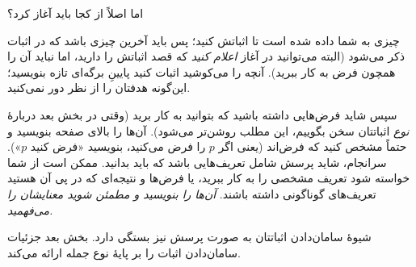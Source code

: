 \documentclass[../../../include/open-logic-section]{subfiles}
\begin{document}


اما اصلاً از کجا باید آغاز کرد؟

چیزی به شما داده شده است تا اثباتش کنید؛ پس باید آخرین چیزی باشد که
در اثبات ذکر می‌شود (البته می‌توانید در آغاز \emph{اعلام کنید} که
قصد اثباتش را دارید، اما نباید آن را همچون فرض به کار ببرید).
آنچه را می‌کوشید اثبات کنید پایینِ برگه‌ای تازه بنویسید؛ این‌گونه
هدفتان را از نظر دور نمی‌کنید.

سپس شاید فرض‌هایی داشته باشید که بتوانید به کار برید (وقتی در بخش
بعد دربارهٔ \emph{نوع} اثباتتان سخن بگوییم، این مطلب روشن‌تر
می‌شود). آن‌ها را بالای صفحه بنویسید و حتماً مشخص کنید که فرض‌اند
(یعنی اگر $p$ را فرض می‌کنید، بنویسید «فرض کنید $p$»). سرانجام،
شاید پرسش شامل تعریف‌هایی باشد که باید بدانید. ممکن است از شما
خواسته شود تعریف مشخصی را به کار ببرید، یا فرض‌ها و نتیجه‌ای که
در پی آن هستید تعریف‌های گوناگونی داشته باشند.
\emph{آن‌ها را بنویسید و مطمئن شوید معنایشان را می‌فهمید.}

شیوهٔ سامان‌دادن اثباتتان به صورت پرسش نیز بستگی دارد. بخش بعد
جزئیات سامان‌دادن اثبات را بر پایهٔ نوع جمله ارائه می‌کند.
\end{document}
